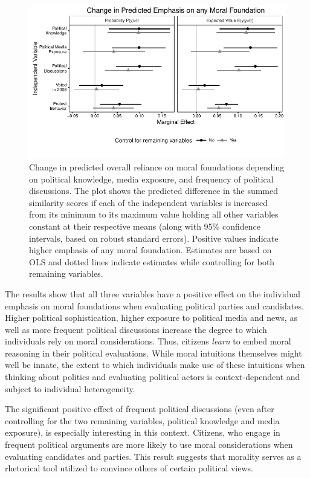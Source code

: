 \documentclass[12pt]{article}
\begin{document}
\begin{figure}[h]\centering
\includegraphics{../calc/fig/tobit_learn.pdf}
\caption{Change in predicted overall reliance on moral foundations depending on political knowledge, media exposure, and frequency of political discussions. The plot shows the predicted difference in the summed similarity scores if each of the independent variables is increased from its minimum to its maximum value holding all other variables constant at their respective means (along with 95\% confidence intervals, based on robust standard errors). Positive values indicate higher emphasis of any moral foundation. Estimates are based on OLS and dotted lines indicate estimates while controlling for both remaining variables. %
}\label{fig:tobit_learn}
\end{figure}

The results show that all three variables have a positive effect on the individual emphasis on moral foundations when evaluating political parties and candidates. Higher political sophistication, higher exposure to political media and news, as well as more frequent political discussions increase the degree to which individuals rely on moral considerations. Thus, citizens \textit{learn} to embed moral reasoning in their political evaluations. While moral intuitions themselves might well be innate, the extent to which individuals make use of these intuitions when thinking about politics and evaluating political actors is context-dependent and subject to individual heterogeneity.

The significant positive effect of frequent political discussions (even after controlling for the two remaining variables, political knowledge and media exposure), is especially interesting in this context. Citizens, who engage in frequent political arguments are more likely to use moral considerations when evaluating candidates and parties. This result suggests that morality serves as a rhetorical tool utilized to convince others of certain political views.
\end{document}
